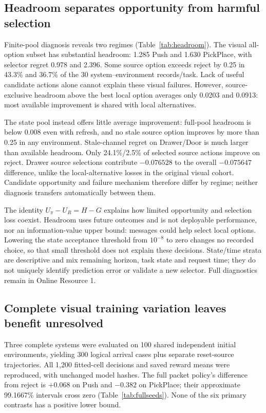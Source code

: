 \subsection{Headroom separates opportunity from harmful selection}\label{sec:headroomresults}
Finite-pool diagnosis reveals two regimes (Table~\ref{tab:headroom}). The visual all-option subset has substantial headroom: 1.285 Push and 1.630 PickPlace, with selector regret 0.978 and 2.396. Some source option exceeds reject by 0.25 in 43.3\% and 36.7\% of the 30 system--environment records/task. Lack of useful candidate actions alone cannot explain these visual failures. However, source-exclusive headroom above the best local option averages only 0.0203 and 0.0913: most available improvement is shared with local alternatives.


The state pool instead offers little average improvement: full-pool headroom is below 0.008 even with refresh, and no stale source option improves by more than 0.25 in any environment. Stale-channel regret on Drawer/Door is much larger than available headroom. Only 24.1\%/2.5\% of selected source actions improve on reject. Drawer source selections contribute $-0.076528$ to the overall $-0.075647$ difference, unlike the local-alternative losses in the original visual cohort. Candidate opportunity and failure mechanism therefore differ by regime; neither diagnosis transfers automatically between them.

The identity $U_\pi-U_R=H-G$ explains how limited opportunity and selection loss coexist. Headroom uses future outcomes and is not deployable performance, nor an information-value upper bound: messages could help select local options. Lowering the state acceptance threshold from $10^{-8}$ to zero changes no recorded choice, so that small threshold does not explain these decisions. State/time strata are descriptive and mix remaining horizon, task state and request time; they do not uniquely identify prediction error or validate a new selector. Full diagnostics remain in Online Resource 1.

\subsection{Complete visual training variation leaves benefit unresolved}\label{sec:fullseedresults}
Three complete systems were evaluated on 100 shared independent initial environments, yielding 300 logical arrival cases plus separate reset-source trajectories. All 1,200 fitted-cell decisions and saved reward means were reproduced, with unchanged model hashes. The full packet policy's difference from reject is $+0.068$ on Push and $-0.382$ on PickPlace; their approximate 99.1667\% intervals cross zero (Table~\ref{tab:fullseeds}). None of the six primary contrasts has a positive lower bound.


